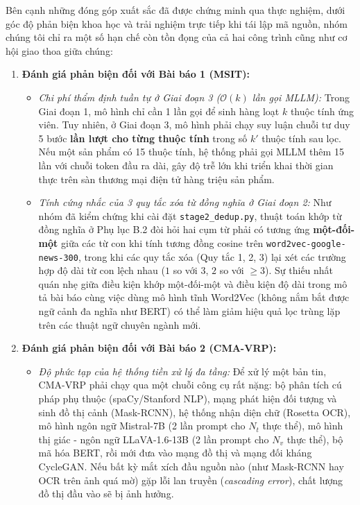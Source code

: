 \documentclass[conference,10pt]{IEEEtran}
\begin{document}
Bên cạnh những đóng góp xuất sắc đã được chứng minh qua thực nghiệm, dưới góc độ phản biện khoa học và trải nghiệm trực tiếp khi tái lập mã nguồn, nhóm chúng tôi chỉ ra một số hạn chế còn tồn đọng của cả hai công trình cũng như cơ hội giao thoa giữa chúng:
\begin{enumerate}
    \item \textbf{Đánh giá phản biện đối với Bài báo 1 (MSIT):}
    \begin{itemize}
        \item \textit{Chi phí thẩm định tuần tự ở Giai đoạn 3 ($\mathcal{O}(k)$ lần gọi MLLM):} Trong Giai đoạn 1, mô hình chỉ cần 1 lần gọi để sinh hàng loạt $k$ thuộc tính ứng viên. Tuy nhiên, ở Giai đoạn 3, mô hình phải chạy suy luận chuỗi tư duy 5 bước \textbf{lần lượt cho từng thuộc tính} trong số $k'$ thuộc tính sau lọc. Nếu một sản phẩm có 15 thuộc tính, hệ thống phải gọi MLLM thêm 15 lần với chuỗi token đầu ra dài, gây độ trễ lớn khi triển khai thời gian thực trên sàn thương mại điện tử hàng triệu sản phẩm.
        \item \textit{Tính cứng nhắc của 3 quy tắc xóa từ đồng nghĩa ở Giai đoạn 2:} Như nhóm đã kiểm chứng khi cài đặt \texttt{stage2\_dedup.py}, thuật toán khớp từ đồng nghĩa ở Phụ lục B.2 đòi hỏi hai cụm từ phải có tương ứng \textbf{một-đối-một} giữa các từ con khi tính tương đồng cosine trên \texttt{word2vec-google-news-300}, trong khi các quy tắc xóa (Quy tắc 1, 2, 3) lại xét các trường hợp độ dài từ con lệch nhau ($1$ so với $3$, $2$ so với $\ge 3$). Sự thiếu nhất quán nhẹ giữa điều kiện khớp một-đối-một và điều kiện độ dài trong mô tả bài báo cùng việc dùng mô hình tĩnh Word2Vec (không nắm bắt được ngữ cảnh đa nghĩa như BERT) có thể làm giảm hiệu quả lọc trùng lặp trên các thuật ngữ chuyên ngành mới.
    \end{itemize}
    \item \textbf{Đánh giá phản biện đối với Bài báo 2 (CMA-VRP):}
    \begin{itemize}
        \item \textit{Độ phức tạp của hệ thống tiền xử lý đa tầng:} Để xử lý một bản tin, CMA-VRP phải chạy qua một chuỗi công cụ rất nặng: bộ phân tích cú pháp phụ thuộc (spaCy/Stanford NLP), mạng phát hiện đối tượng và sinh đồ thị cảnh (Mask-RCNN), hệ thống nhận diện chữ (Rosetta OCR), mô hình ngôn ngữ Mistral-7B (2 lần prompt cho $N_t$ thực thể), mô hình thị giác - ngôn ngữ LLaVA-1.6-13B (2 lần prompt cho $N_v$ thực thể), bộ mã hóa BERT, rồi mới đưa vào mạng đồ thị và mạng đối kháng CycleGAN. Nếu bất kỳ mắt xích đầu nguồn nào (như Mask-RCNN hay OCR trên ảnh quá mờ) gặp lỗi lan truyền (\textit{cascading error}), chất lượng đồ thị đầu vào sẽ bị ảnh hưởng.

\end{itemize}
\end{enumerate}
\end{document}
